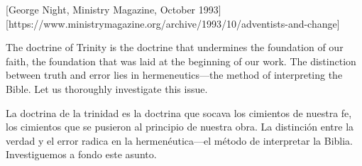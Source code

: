 [George Night, Ministry Magazine, October 1993][https://www.ministrymagazine.org/archive/1993/10/adventists-and-change]


The doctrine of Trinity is the doctrine that undermines the foundation of our faith, the foundation that was laid at the beginning of our work. The distinction between truth and error lies in hermeneutics—the method of interpreting the Bible. Let us thoroughly investigate this issue.


La doctrina de la trinidad es la doctrina que socava los cimientos de nuestra fe, los cimientos que se pusieron al principio de nuestra obra. La distinción entre la verdad y el error radica en la hermenéutica—el método de interpretar la Biblia. Investiguemos a fondo este asunto.





% 

